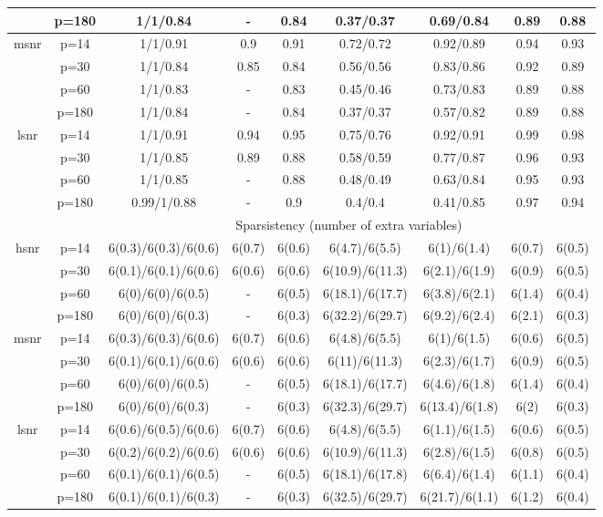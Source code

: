 \begin{table}[ht]
{\begin{tabular}{|c|c|ccccccc|}
   & p=180 & 1/1/0.84 & - & 0.84 & 0.37/0.37 & 0.69/0.84 & 0.89 & 0.88 \\ 
  \midrule\multirow{4}[2]{*}{msnr} & p=14 & 1/1/0.91 & 0.9 & 0.91 & 0.72/0.72 & 0.92/0.89 & 0.94 & 0.93 \\ 
   & p=30 & 1/1/0.84 & 0.85 & 0.84 & 0.56/0.56 & 0.83/0.86 & 0.92 & 0.89 \\ 
   & p=60 & 1/1/0.83 & - & 0.83 & 0.45/0.46 & 0.73/0.83 & 0.89 & 0.88 \\ 
   & p=180 & 1/1/0.84 & - & 0.84 & 0.37/0.37 & 0.57/0.82 & 0.89 & 0.88 \\ 
  \midrule\multirow{4}[2]{*}{lsnr} & p=14 & 1/1/0.91 & 0.94 & 0.95 & 0.75/0.76 & 0.92/0.91 & 0.99 & 0.98 \\ 
   & p=30 & 1/1/0.85 & 0.89 & 0.88 & 0.58/0.59 & 0.77/0.87 & 0.96 & 0.93 \\ 
   & p=60 & 1/1/0.85 & - & 0.88 & 0.48/0.49 & 0.63/0.84 & 0.95 & 0.93 \\ 
   & p=180 & 0.99/1/0.88 & - & 0.9 & 0.4/0.4 & 0.41/0.85 & 0.97 & 0.94 \\ 
   \midrule 
 \multicolumn{1}{|c}{} &       & \multicolumn{7}{c|}{Sparsistency (number of extra variables)} \\
\midrule\multirow{4}[2]{*}{hsnr} & p=14 & 6(0.3)/6(0.3)/6(0.6) & 6(0.7) & 6(0.6) & 6(4.7)/6(5.5) & 6(1)/6(1.4) & 6(0.7) & 6(0.5) \\ 
   & p=30 & 6(0.1)/6(0.1)/6(0.6) & 6(0.6) & 6(0.6) & 6(10.9)/6(11.3) & 6(2.1)/6(1.9) & 6(0.9) & 6(0.5) \\ 
   & p=60 & 6(0)/6(0)/6(0.5) & - & 6(0.5) & 6(18.1)/6(17.7) & 6(3.8)/6(2.1) & 6(1.4) & 6(0.4) \\ 
   & p=180 & 6(0)/6(0)/6(0.3) & - & 6(0.3) & 6(32.2)/6(29.7) & 6(9.2)/6(2.4) & 6(2.1) & 6(0.3) \\ 
  \midrule\multirow{4}[2]{*}{msnr} & p=14 & 6(0.3)/6(0.3)/6(0.6) & 6(0.7) & 6(0.6) & 6(4.8)/6(5.5) & 6(1)/6(1.5) & 6(0.6) & 6(0.5) \\ 
   & p=30 & 6(0.1)/6(0.1)/6(0.6) & 6(0.6) & 6(0.6) & 6(11)/6(11.3) & 6(2.3)/6(1.7) & 6(0.9) & 6(0.5) \\ 
   & p=60 & 6(0)/6(0)/6(0.5) & - & 6(0.5) & 6(18.1)/6(17.7) & 6(4.6)/6(1.8) & 6(1.4) & 6(0.4) \\ 
   & p=180 & 6(0)/6(0)/6(0.3) & - & 6(0.3) & 6(32.3)/6(29.7) & 6(13.4)/6(1.8) & 6(2) & 6(0.3) \\ 
  \midrule\multirow{4}[2]{*}{lsnr} & p=14 & 6(0.6)/6(0.5)/6(0.6) & 6(0.7) & 6(0.6) & 6(4.8)/6(5.5) & 6(1.1)/6(1.5) & 6(0.6) & 6(0.5) \\ 
   & p=30 & 6(0.2)/6(0.2)/6(0.6) & 6(0.6) & 6(0.6) & 6(10.9)/6(11.3) & 6(2.8)/6(1.5) & 6(0.8) & 6(0.5) \\ 
   & p=60 & 6(0.1)/6(0.1)/6(0.5) & - & 6(0.5) & 6(18.1)/6(17.8) & 6(6.4)/6(1.4) & 6(1.1) & 6(0.4) \\ 
   & p=180 & 6(0.1)/6(0.1)/6(0.3) & - & 6(0.3) & 6(32.5)/6(29.7) & 6(21.7)/6(1.1) & 6(1.2) & 6(0.4) \\ 
   \bottomrule 
\end{tabular}
}
\end{table}
